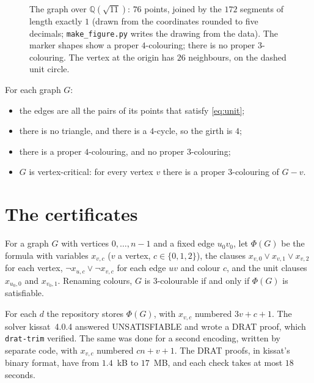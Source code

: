 \documentclass[11pt,a4paper]{amsart}
\theoremstyle{remark}
\newcommand{\Q}{\mathbb{Q}}
\begin{document}
\begin{table}[ht]
\centering

\medskip
\caption{The graphs of Theorem~\ref{thm:main}. $D$ is the common denominator; ``directions used'' counts the
unit vectors $v-u$ over the edges $uv$, with both signs.}\label{tab:graphs}
\end{table}

\begin{figure}[ht]
\centering

\caption{The graph over $\Q(\sqrt{11})$: $76$ points, joined by the $172$ segments of length exactly $1$ (drawn from
the coordinates rounded to five decimals; \texttt{make\_figure.py} writes the drawing from the data). The marker
shapes show a proper $4$-colouring; there is no proper $3$-colouring. The vertex at the origin has $26$ neighbours, on
the dashed unit circle.}\label{fig:q11}
\end{figure}

For each graph $G$:
\begin{itemize}
\item the edges are all the pairs of its points that satisfy \eqref{eq:unit};
\item there is no triangle, and there is a $4$-cycle, so the girth is $4$;
\item there is a proper $4$-colouring, and no proper $3$-colouring;
\item $G$ is vertex-critical: for every vertex $v$ there is a proper $3$-colouring of $G-v$.
\end{itemize}

\section{The certificates}\label{sec:cert}

For a graph $G$ with vertices $0,\dots,n-1$ and a fixed edge $u_0v_0$, let $\Phi(G)$ be the formula with
variables $x_{v,c}$ ($v$ a vertex, $c\in\{0,1,2\}$), the clauses $x_{v,0}\lor x_{v,1}\lor x_{v,2}$ for each
vertex, $\lnot x_{u,c}\lor\lnot x_{v,c}$ for each edge $uv$ and colour $c$, and the unit clauses $x_{u_0,0}$
and $x_{v_0,1}$. Renaming colours, $G$ is $3$-colourable if and only if $\Phi(G)$ is satisfiable.

For each $d$ the repository stores $\Phi(G)$, with $x_{v,c}$ numbered $3v+c+1$. The solver kissat~4.0.4
answered UNSATISFIABLE and wrote a DRAT proof, which \texttt{drat-trim} verified. The same was done for a second
encoding, written by separate code, with $x_{v,c}$ numbered $cn+v+1$. The DRAT proofs, in kissat's binary format,
have from $1.4$~kB to $17$~MB, and each check takes at most $18$ seconds.
\end{document}
